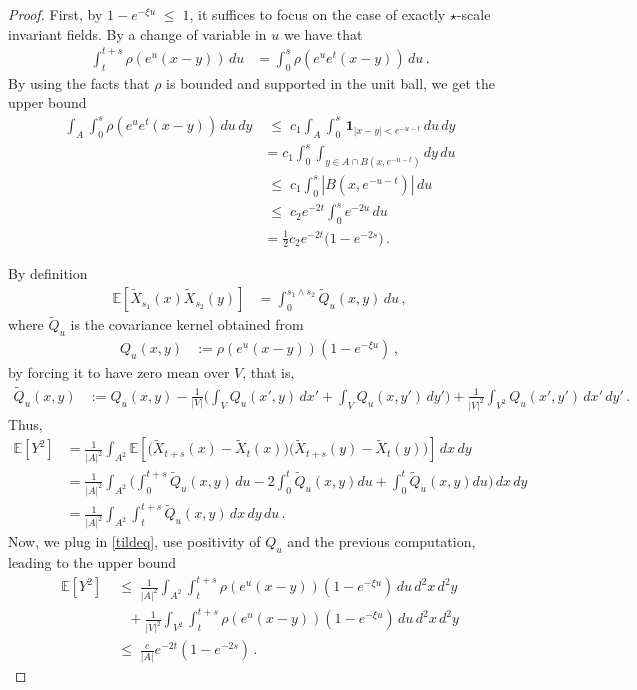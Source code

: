 \documentclass[11pt]{article}
\numberwithin{equation}{section}
\newcounter{exa}
\theoremstyle{definition}
\renewcommand{\tilde}{\widetilde}          %
\renewcommand{\leq}{\;\leqslant\;}                   %
\newcommand{\E}{\mathbb{E}}
\newcommand{\ab}{|}
\begin{document}
\begin{proof} 
First, by $1-e^{-\xi u} \leq 1$, it suffices to focus on the case of exactly $\star$-scale invariant fields. By a change of variable in $u$ we have that 
\begin{align*}
 \int_t^{t+s} \rho(e^u(x-y)) \, du  &=   \int_0^{s} \rho(e^{u} e^t(x-y)) \, du \,.
 \end{align*}
 By using the facts that $\rho$ is bounded and supported in the unit ball, we get the upper bound
 \begin{align*}
\int_{A} \int_0^{s} \rho(e^{u} e^t(x-y)) \, du \, dy & \leq c_1 \int_{A} \int_0^{s} \,  \mathbf{1}_{|x-y| < e^{-u-t}} \, du \, dy \\
&= c_1 \int_0^s   \int_{y \in A \cap B(x,e^{-u-t})} dy \, du \\
  & \leq c_1  \int_0^s  |B(x,e^{-u-t}) | \, du  \\
  & \leq c_2  e^{-2t} \int_0^s e^{-2u} \, du \\
  &= \tfrac 12 c_2  e^{-2t} \big( 1 - e^{-2s} \big)\,.
\end{align*}

\noindent By definition
\begin{align*}
\E[ \tilde X_{s_1}(x) \tilde X_{s_2}(y) ] &= \int_0^{s_1 \land s_2} \widetilde Q_u(x,y) \, du \,,
\end{align*}
where $\widetilde Q_u$ is the covariance kernel obtained from
\begin{align*}
Q_u(x,y) &:= \rho(e^u(x-y)) (1-e^{-\xi u}) \,,
\end{align*}
by forcing it to have zero mean over $V$, that is,
\begin{align}\label{tildeq}
\widetilde Q_u(x,y) &:=  Q_u(x,y) - \frac{1}{\ab V \ab} \big( \int_V Q_u(x',y) \, dx' + \int_V Q_u(x,y') \, dy' \big) + \frac{1}{\ab V \ab^2} \int_{V^2} Q_u(x',y') \,dx' \, dy'\,.
\end{align}
Thus,
\begin{align*}
\E[Y^2] &= \frac{1}{\ab A \ab^2} \int_{A^2} \E[ \big( \tilde X_{t+s}(x)- \tilde X_t(x) \big) \big( \tilde X_{t+s}(y)- \tilde X_t(y) \big)] \, dx \, dy \\
&= \frac{1}{\ab A \ab^2} \int_{A^2} \big( \int_0^{t+s} \widetilde Q_u(x,y) \, du  - 2 \int_0^{t}\widetilde Q_u(x,y) du + \int_0^t \widetilde Q_u(x,y) du   \big) \, dx \, dy \\
&= \frac{1}{\ab A \ab^2} \int_{A^2} \int_t^{t+s} \widetilde Q_u(x,y) \,dx \,dy \,  du\,.
\end{align*}
Now, we plug in \eqref{tildeq}, use positivity of $Q_u$ and the previous computation, leading to the upper bound 
\begin{align*}
\E[Y^2] &\leq \frac{1}{\ab A \ab^2} \int_{A^2} \int_t^{t+s} \rho(e^u (x-y) ) (1-e^{-\xi u}) \, du \, d^2x \, d^2y  \\
& \quad + \frac{1}{\ab V \ab^2}\int_{V^2} \int_t^{t+s} \rho(e^u (x-y) )(1-e^{-\xi u}) \, du \, d^2x \, d^2y \\
& \leq  \frac{c}{\ab A \ab} e^{-2t}(1-e^{-2s})\,.
\end{align*}


\end{proof}
\end{document}
